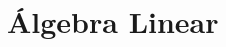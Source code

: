 \documentclass[../../main]{subfiles}
\begin{document}
    \section{Álgebra Linear}\label{section:algebra-linear}

    
\end{document}
